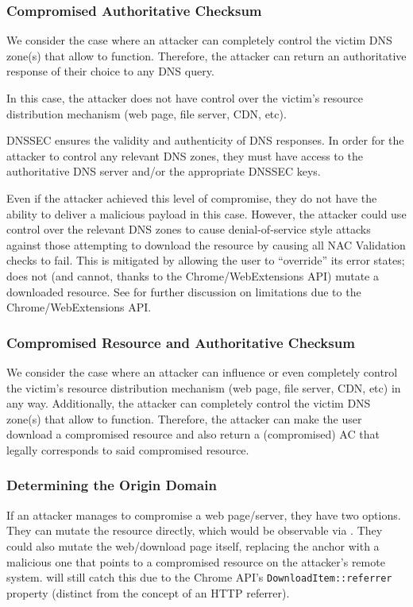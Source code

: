 \subsubsection{Compromised Authoritative Checksum}

We consider the case where an attacker can completely control the victim DNS
zone(s) that allow \SYSTEM{} to function. Therefore, the attacker can return an
authoritative response of their choice to any DNS query.

In this case, the attacker does not have control over the victim's resource
distribution mechanism (web page, file server, CDN, etc).

DNSSEC ensures the validity and authenticity of DNS responses. In order for the
attacker to control any relevant DNS zones, they must have access to the
authoritative DNS server and/or the appropriate DNSSEC keys.

Even if the attacker achieved this level of compromise, they do not have the
ability to deliver a malicious payload in this case. However, the attacker
could use control over the relevant DNS zones to cause denial-of-service style
attacks against those attempting to download the resource by causing all NAC
Validation checks to fail. This is mitigated by \SYSTEM{} allowing the user to
``override'' its error states; \ie \SYSTEM{} does not (and cannot, thanks to
the Chrome/WebExtensions API) mutate a downloaded resource. See
 for further discussion on limitations due to the
Chrome/WebExtensions API.

\subsubsection{Compromised Resource and Authoritative Checksum}

We consider the case where an attacker can influence or even completely control
the victim's resource distribution mechanism (web page, file server, CDN, etc)
in any way. Additionally, the attacker can completely control the victim DNS
zone(s) that allow \SYSTEM{} to function. Therefore, the attacker can make the
user download a compromised resource and also return a (compromised) AC that
legally corresponds to said compromised resource.

\subsubsection{Determining the Origin Domain}

If an attacker manages to compromise a web page/server, they have two options.
They can mutate the resource directly, which would be observable via \SYSTEM{}.
They could also mutate the web/download page itself, replacing the anchor with a
malicious one that points to a compromised resource on the attacker's remote
system. \SYSTEM{} will still catch this due to the Chrome API's
\texttt{DownloadItem::referrer} property (distinct from the concept of an HTTP
referrer).

